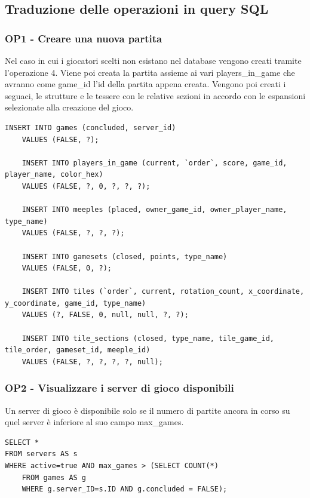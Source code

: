 \clearpage
\subsection{Traduzione delle operazioni in query SQL}
\subsubsection*{OP1 - Creare una nuova partita}
Nel caso in cui i giocatori scelti non esistano nel database vengono creati tramite l'operazione 4. Viene poi creata la partita assieme ai vari players\_in\_game che avranno come game\_id l'id della partita appena creata. Vengono poi creati i seguaci, le strutture e le tessere con le relative sezioni in accordo con le espansioni selezionate alla creazione del gioco.
\medskip

\begin{lstlisting}[style=sql]
    INSERT INTO games (concluded, server_id)
    VALUES (FALSE, ?);

    INSERT INTO players_in_game (current, `order`, score, game_id, player_name, color_hex)
    VALUES (FALSE, ?, 0, ?, ?, ?);

    INSERT INTO meeples (placed, owner_game_id, owner_player_name, type_name)
    VALUES (FALSE, ?, ?, ?);

    INSERT INTO gamesets (closed, points, type_name)
    VALUES (FALSE, 0, ?);

    INSERT INTO tiles (`order`, current, rotation_count, x_coordinate, y_coordinate, game_id, type_name)
    VALUES (?, FALSE, 0, null, null, ?, ?);

    INSERT INTO tile_sections (closed, type_name, tile_game_id, tile_order, gameset_id, meeple_id)
    VALUES (FALSE, ?, ?, ?, ?, null);
\end{lstlisting}

\subsubsection*{OP2 - Visualizzare i server di gioco disponibili}
Un server di gioco è disponibile solo se il numero di partite ancora in corso su quel server è inferiore al suo campo max\_games.
\medskip

\begin{lstlisting}[style=sql]
SELECT *
FROM servers AS s
WHERE active=true AND max_games > (SELECT COUNT(*)
    FROM games AS g
    WHERE g.server_ID=s.ID AND g.concluded = FALSE);
\end{lstlisting}

